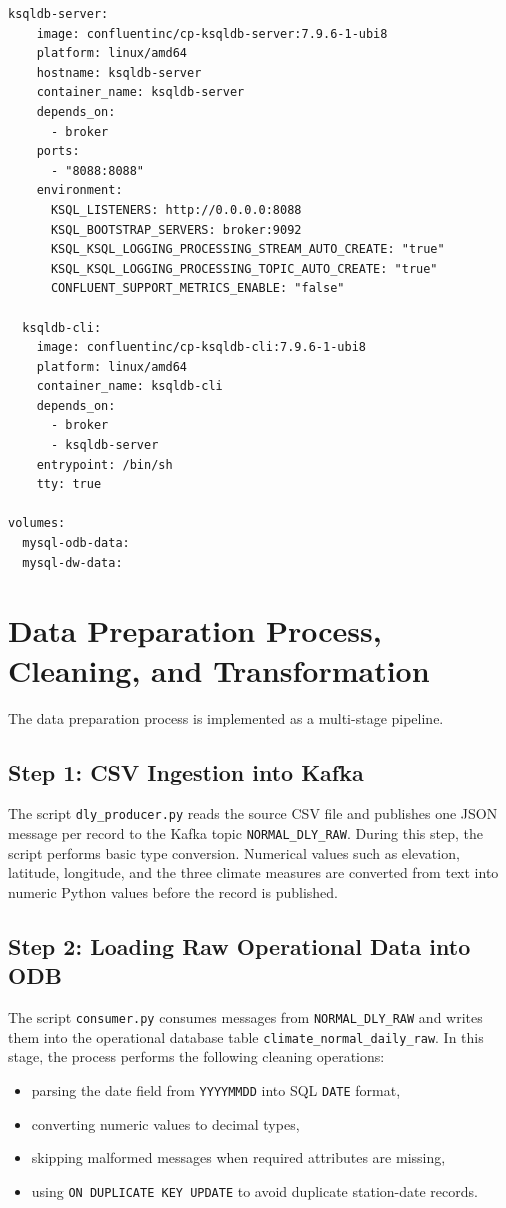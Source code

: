 \documentclass[11pt]{article}
\begin{document}
\begin{lstlisting}[language={}]
  ksqldb-server:
    image: confluentinc/cp-ksqldb-server:7.9.6-1-ubi8
    platform: linux/amd64
    hostname: ksqldb-server
    container_name: ksqldb-server
    depends_on:
      - broker
    ports:
      - "8088:8088"
    environment:
      KSQL_LISTENERS: http://0.0.0.0:8088
      KSQL_BOOTSTRAP_SERVERS: broker:9092
      KSQL_KSQL_LOGGING_PROCESSING_STREAM_AUTO_CREATE: "true"
      KSQL_KSQL_LOGGING_PROCESSING_TOPIC_AUTO_CREATE: "true"
      CONFLUENT_SUPPORT_METRICS_ENABLE: "false"

  ksqldb-cli:
    image: confluentinc/cp-ksqldb-cli:7.9.6-1-ubi8
    platform: linux/amd64
    container_name: ksqldb-cli
    depends_on:
      - broker
      - ksqldb-server
    entrypoint: /bin/sh
    tty: true

volumes:
  mysql-odb-data:
  mysql-dw-data:
\end{lstlisting}

\section{Data Preparation Process, Cleaning, and Transformation}
The data preparation process is implemented as a multi-stage pipeline.

\subsection{Step 1: CSV Ingestion into Kafka}
The script \texttt{dly\_producer.py} reads the source CSV file and publishes one JSON message per record to the Kafka topic \texttt{NORMAL\_DLY\_RAW}. During this step, the script performs basic type conversion. Numerical values such as elevation, latitude, longitude, and the three climate measures are converted from text into numeric Python values before the record is published.

\subsection{Step 2: Loading Raw Operational Data into ODB}
The script \texttt{consumer.py} consumes messages from \texttt{NORMAL\_DLY\_RAW} and writes them into the operational database table \texttt{climate\_normal\_daily\_raw}. In this stage, the process performs the following cleaning operations:
\begin{itemize}
    \item parsing the date field from \texttt{YYYYMMDD} into SQL \texttt{DATE} format,
    \item converting numeric values to decimal types,
    \item skipping malformed messages when required attributes are missing,
    \item using \texttt{ON DUPLICATE KEY UPDATE} to avoid duplicate station-date records.
\end{itemize}
\end{document}
